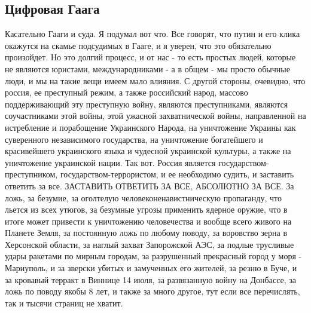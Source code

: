  
 
 
 
 

\subsection{Цифровая Гаага}

Касательно Гааги и суда. Я подумал вот что. Все говорят, что путин и его клика
окажутся на скамье подсудимых в Гааге, и я уверен, что это обязательно
произойдет. Но это долгий процесс, и от нас - то есть простых людей, которые не
являются юристами, международниками - а в общем - мы просто обычные люди, и мы
на такие вещи имеем мало влияния. С другой стороны, очевидно, что россия, ее
преступный режим, а также российский народ, массово поддерживающий эту
преступную войну, являются преступниками, являются соучастниками этой войны,
этой ужасной захватнической войны, направленной на истребление и порабощение
Украинского Народа, на уничтожение Украины как суверенного независимого
государства, на уничтожение богатейшего и красивейшего украинского языка и
чудесной украинской культуры, а также на уничтожение украинской нации. Так вот.
Россия является государством-преступником, государством-террористом, и ее
необходимо судить, и заставить ответить за все. ЗАСТАВИТЬ ОТВЕТИТЬ ЗА ВСЕ,
АБСОЛЮТНО ЗА ВСЕ. За ложь, за безумие, за оголтелую человеконенавистническую
пропаганду, что льется из всех утюгов, за безумные угрозы применить ядерное
оружие, что в итоге может привести к уничтожению человечества и вообще всего
живого на Планете Земля, за постоянную ложь по любому поводу, за воровство
зерна в Херсонской области, за наглый захват Запорожской АЭС, за подлые
трусливые удары ракетами по мирным городам, за разрушенный прекрасный город у
моря - Мариуполь, и за зверски убитых и замученных его жителей, за резню в
Буче, и за кровавый терракт в Виннице 14 июля, за развязанную войну на
Донбассе, за ложь по поводу якобы 8 лет, и также за много другое, тут если все
перечислять, так и тысячи страниц не хватит.

